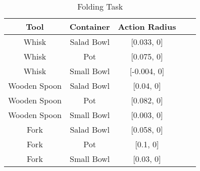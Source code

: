 \begin{table}[H]
    \centering
    \begin{tabular}{|c|c|c|c|c|}
    \hline
    \textbf{Tool} & \textbf{Container} & \textbf{Action Radius}\\
    \hline
    Whisk & Salad Bowl & [0.033, 0] \\
    \hline
    Whisk & Pot & [0.075, 0] \\
    \hline
    Whisk & Small Bowl & [-0.004, 0]\\
    \hline
    Wooden Spoon & Salad Bowl & [0.04, 0] \\
    \hline
    Wooden Spoon & Pot & [0.082, 0] \\
    \hline
    Wooden Spoon & Small Bowl & [0.003, 0] \\
    \hline
    Fork & Salad Bowl & [0.058, 0] \\
    \hline
    Fork & Pot & [0.1, 0] \\
    \hline
    Fork & Small Bowl & [0.03, 0] \\
    \hline
\end{tabular}
\caption{Folding Task}

\end{table}